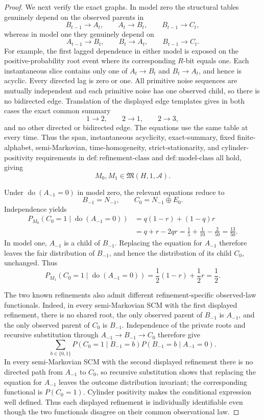 \documentclass{article}
\begin{document}
\begin{proof}
We next verify the exact graphs.  In model zero the structural tables genuinely depend on the observed parents in
\[
 B_{t-1}\to A_t,\qquad A_t\to B_t,\qquad B_{t-1}\to C_t,
\]
whereas in model one they genuinely depend on
\[
 A_{t-1}\to B_t,\qquad B_t\to A_t,\qquad B_{t-1}\to C_t.
\]
For example, the first lagged dependence in either model is exposed on the positive-probability root event where its corresponding \(R\)-bit equals one.  Each instantaneous slice contains only one of \(A_t\to B_t\) and \(B_t\to A_t\), and hence is acyclic.  Every directed lag is zero or one.  All primitive noise sequences are mutually independent and each primitive noise has one observed child, so there is no bidirected edge.  Translation of the displayed edge templates gives in both cases the exact common summary
\[
 1\to2,\qquad 2\to1,\qquad 2\to3,
\]
and no other directed or bidirected edge.  The equations use the same table at every time.  Thus the span, instantaneous acyclicity, exact-summary, fixed finite-alphabet, semi-Markovian, time-homogeneity, strict-stationarity, and cylinder-positivity requirements in \(\mathrm{def:refinement\text{-}class}\) and \(\mathrm{def:model\text{-}class}\) all hold, giving
\[
 M_0,M_1\in\mathfrak M(H,1,\mathcal A).
\]

Under \(\operatorname{do}(A_{-1}=0)\) in model zero, the relevant equations reduce to
\[
 B_{-1}=N_{-1},\qquad C_0=N_{-1}\oplus E_0.
\]
Independence yields
\[
 \begin{aligned}
 P_{M_0}(C_0=1\mid\operatorname{do}(A_{-1}=0))
 &=q(1-r)+(1-q)r\\
 &=q+r-2qr
 =\frac15+\frac1{10}-\frac2{50}
 =\frac{13}{50}.
 \end{aligned}
\]
In model one, \(A_{-1}\) is a child of \(B_{-1}\).  Replacing the equation for \(A_{-1}\) therefore leaves the fair distribution of \(B_{-1}\), and hence the distribution of its child \(C_0\), unchanged.  Thus
\[
 P_{M_1}(C_0=1\mid\operatorname{do}(A_{-1}=0))
 =\frac12(1-r)+\frac12r=\frac12.
\]

The two known refinements also admit different refinement-specific observed-law functionals.  Indeed, in every semi-Markovian SCM with the first displayed refinement, there is no shared root, the only observed parent of \(B_{-1}\) is \(A_{-1}\), and the only observed parent of \(C_0\) is \(B_{-1}\).  Independence of the private roots and recursive substitution through \(A_{-1}\to B_{-1}\to C_0\) therefore give
\[
 \sum_{b\in\{0,1\}}P(C_0=1\mid B_{-1}=b)P(B_{-1}=b\mid A_{-1}=0).
\]
In every semi-Markovian SCM with the second displayed refinement there is no directed path from \(A_{-1}\) to \(C_0\), so recursive substitution shows that replacing the equation for \(A_{-1}\) leaves the outcome distribution invariant; the corresponding functional is \(P(C_0=1)\).  Cylinder positivity makes the conditional expression well defined.  Thus each displayed refinement is individually identifiable even though the two functionals disagree on their common observational law.


\end{proof}
\end{document}
